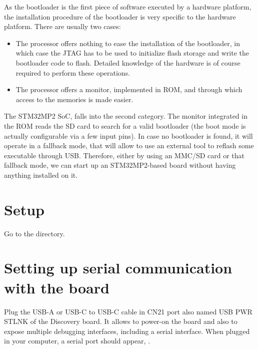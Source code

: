 
As the bootloader is the first piece of software executed by a
hardware platform, the installation procedure of the bootloader is
very specific to the hardware platform. There are usually two cases:

\begin{itemize}

\item The processor offers nothing to ease the installation of the
  bootloader, in which case the JTAG has to be used to initialize
  flash storage and write the bootloader code to flash. Detailed
  knowledge of the hardware is of course required to perform these
  operations.

\item The processor offers a monitor, implemented in ROM, and through
  which access to the memories is made easier.

\end{itemize}

The STM32MP2 SoC, falls into the second category. The monitor integrated in the
ROM reads the SD card to search for a valid bootloader
(the boot mode is actually configurable via a few input pins).
In case no bootloader is found, it will operate in a fallback mode, that will
allow to use an external tool to reflash some executable through USB.
Therefore, either by using an MMC/SD card or that fallback mode, we can start
up an STM32MP2-based board without having anything installed on it.
\section{Setup}

Go to the  directory.

\section{Setting up serial communication with the board}

Plug the USB-A or USB-C to USB-C cable in CN21 port also named USB PWR STLNK
of the Discovery board. It allows to power-on the board and also to expose
multiple debugging interfaces, including a serial interface.
When plugged in your computer, a serial port should appear, {\tt \hosttty}.

